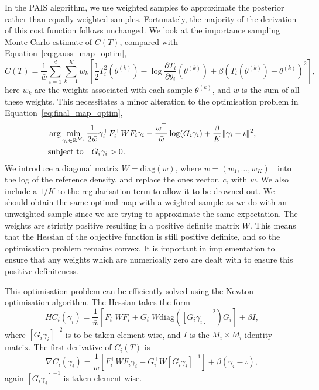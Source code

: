 \documentclass[final]{siamltex}
\begin{document}
In the PAIS algorithm, we use weighted samples to approximate the posterior rather than equally weighted samples. Fortunately, the majority of the derivation of this cost function follows unchanged. We look at the importance sampling Monte Carlo estimate of $C(T)$, compared with
Equation~\eqref{eq:gauss_map_optim},
\begin{equation}\label{eqn:TPAIS_objective}
	C(T) = \frac{1}{\bar{w}}\sum\limits_{i=1}^d \! \sum\limits_{k=1}^K
		w_k\left[\frac{1}{2}T_i^2(\theta^{(k)}) - \log\frac{\partial
		T_i}{\partial\theta_i}(\theta^{(k)}) + \beta(T_i(\theta^{(k)})-\theta^{(k)})^2\right],
\end{equation}
here $w_k$ are the weights associated with each sample $\theta^{(k)}$, and $\bar{w}$ is the sum of
all these weights. This necessitates a minor alteration to the optimisation problem in
Equation~\eqref{eq:final_map_optim},
\begin{align}\label{eq:weighted_map_optim}
	&\arg\min_{\gamma_i\in\mathbb{R}^{M_i}} \frac{1}{2\bar{w}}\gamma_i^\top F_i^\top WF_i\gamma_i -
		\frac{w^\top}{\bar{w}}\log(G_i\gamma_i) + \frac{\beta}{K}\|\gamma_i-\iota\|^2, \\
	&\text{subject to} \quad G_i\gamma_i > 0. \notag
\end{align}
We introduce a diagonal matrix $W = \text{diag}(w)$, where $w = (w_1,\dots,w_K)^\top$ into the log of the reference density, and replace the ones vector, $c$, with $w$. We also include a $1/K$ to the regularisation term to allow it to be drowned out. We should obtain the same optimal map with a weighted sample as we do with an unweighted sample since we are trying to approximate the same expectation. The weights are strictly
positive resulting in a positive definite matrix $W$. This means that the Hessian of the objective
function is still positive definite, and so the optimisation problem remains convex. It is important in implementation to ensure that any weights which are numerically zero are dealt with to ensure this positive definiteness.

This optimisation problem can be efficiently solved using the Newton optimisation algorithm. The Hessian takes the
form
\begin{equation}\label{eqn:TPAIS_hessian}
	HC_i(\gamma_i) = \frac{1}{\bar{w}}\left[F_i^\top WF_i + G_i^\top
		W\text{diag}([G_i\gamma_i]^{-2})G_i\right] + \beta I,
\end{equation}
where $[G_i\gamma_i]^{-2}$ is to be taken element-wise, and $I$ is the $M_i\times M_i$
identity matrix. The first derivative of $C_i(T)$ is
\[
	\nabla C_i(\gamma_i) = \frac{1}{\bar{w}}\left[F_i^\top WF_i\gamma_i - G_i^\top
		W[G_i\gamma_i]^{-1}\right] + \beta(\gamma_i - \iota),
\]
again $[G_i\gamma_i]^{-1}$ is taken element-wise.
\end{document}
